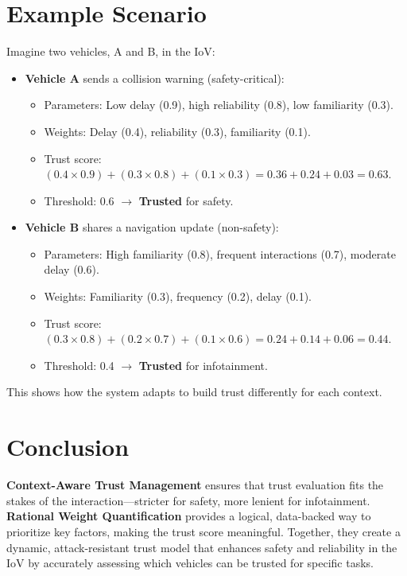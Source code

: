 \documentclass{article}
\begin{document}
\section*{Example Scenario}
Imagine two vehicles, A and B, in the IoV:
\begin{itemize}
    \item \textbf{Vehicle A} sends a collision warning (safety-critical):
    \begin{itemize}
        \item Parameters: Low delay (0.9), high reliability (0.8), low familiarity (0.3).
        \item Weights: Delay (0.4), reliability (0.3), familiarity (0.1).
        \item Trust score: \( (0.4 \times 0.9) + (0.3 \times 0.8) + (0.1 \times 0.3) = 0.36 + 0.24 + 0.03 = 0.63 \).
        \item Threshold: 0.6 \(\rightarrow\) \textbf{Trusted} for safety.
    \end{itemize}
    
    \item \textbf{Vehicle B} shares a navigation update (non-safety):
    \begin{itemize}
        \item Parameters: High familiarity (0.8), frequent interactions (0.7), moderate delay (0.6).
        \item Weights: Familiarity (0.3), frequency (0.2), delay (0.1).
        \item Trust score: \( (0.3 \times 0.8) + (0.2 \times 0.7) + (0.1 \times 0.6) = 0.24 + 0.14 + 0.06 = 0.44 \).
        \item Threshold: 0.4 \(\rightarrow\) \textbf{Trusted} for infotainment.
    \end{itemize}
\end{itemize}

This shows how the system adapts to build trust differently for each context.

\section*{Conclusion}
\textbf{Context-Aware Trust Management} ensures that trust evaluation fits the stakes of the interaction—stricter for safety, more lenient for infotainment. \textbf{Rational Weight Quantification} provides a logical, data-backed way to prioritize key factors, making the trust score meaningful. Together, they create a dynamic, attack-resistant trust model that enhances safety and reliability in the IoV by accurately assessing which vehicles can be trusted for specific tasks.
\end{document}

